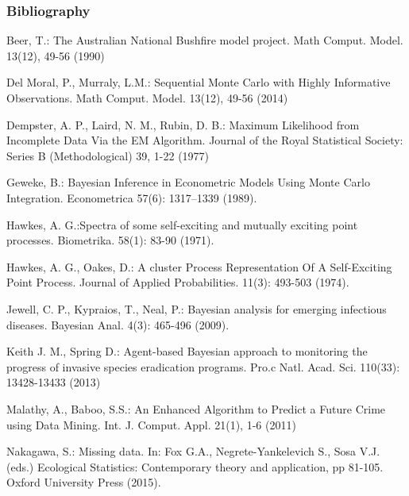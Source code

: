 \documentclass[9pt, xcolor={dvipsnames,svgnames,table}]{beamer}
\begin{document}
\begin{frame}[shrink=15]
\frametitle{Bibliography}
\begin{thebibliography}{}

{\small {} 
Beer, T.: The Australian National Bushfire model project. Math Comput. Model. 13(12), 49-56 (1990)

Del Moral, P., Murraly, L.M.: Sequential Monte Carlo with Highly Informative Observations. Math Comput. Model. 13(12), 49-56 (2014)

Dempster, A. P., Laird, N. M., Rubin, D. B.: Maximum Likelihood from Incomplete Data Via the EM Algorithm. Journal of the Royal Statistical Society: Series B (Methodological) 39, 1-22 (1977)


Geweke, B.: Bayesian Inference in Econometric Models Using Monte Carlo Integration. Econometrica 57(6): 1317–1339 (1989).

 Hawkes, A. G.:Spectra of some self-exciting and mutually exciting point processes. Biometrika. 58(1): 83-90 (1971).

 Hawkes, A. G., Oakes, D.: A cluster Process Representation Of A Self-Exciting Point Process. Journal of Applied Probabilities. 11(3): 493-503 (1974).

 Jewell, C. P., Kypraios, T., Neal, P.: Bayesian analysis for emerging infectious diseases. Bayesian Anal. 4(3): 465-496 (2009).

Keith J. M., Spring D.: Agent-based Bayesian approach to monitoring the progress of invasive species eradication programs. Pro.c Natl. Acad. Sci. 110(33): 13428-13433 (2013)

Malathy, A., Baboo, S.S.: An Enhanced Algorithm to Predict a Future Crime using Data Mining. Int. J. Comput. Appl. 21(1), 1-6 (2011)

Nakagawa, S.: Missing data. In: Fox G.A., Negrete-Yankelevich S., Sosa V.J. (eds.) Ecological Statistics: Contemporary theory and application, pp 81-105. Oxford University Press (2015). 

}
\end{thebibliography}
\end{frame}
\end{document}
